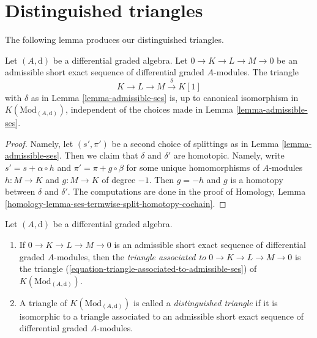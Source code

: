 \section{Distinguished triangles}
\label{section-distinguished}

\noindent
The following lemma produces our distinguished triangles.

\begin{lemma}
\label{lemma-triangle-independent-splittings}
Let $(A, \text{d})$ be a differential graded algebra. Let
$0 \to K \to L \to M \to 0$ be an admissible short exact sequence
of differential graded $A$-modules. The triangle
\begin{equation}
\label{equation-triangle-associated-to-admissible-ses}
K \to L \to M \xrightarrow{\delta} K[1]
\end{equation}
with $\delta$ as in Lemma \ref{lemma-admissible-ses} is, up to canonical
isomorphism in $K(\text{Mod}_{(A, \text{d})})$, independent of the choices
made in Lemma \ref{lemma-admissible-ses}.
\end{lemma}

\begin{proof}
Namely, let $(s', \pi')$ be a second choice of splittings as in
Lemma \ref{lemma-admissible-ses}. Then we claim that $\delta$ and $\delta'$
are homotopic. Namely, write $s' = s + \alpha \circ h$ and
$\pi' = \pi + g \circ \beta$ for some unique homomorphisms
of $A$-modules $h : M \to K$ and $g : M \to K$ of degree $-1$.
Then $g = -h$ and $g$ is a homotopy between $\delta$ and $\delta'$.
The computations are done in the proof of
Homology, Lemma \ref{homology-lemma-ses-termwise-split-homotopy-cochain}.
\end{proof}

\begin{definition}
\label{definition-distinguished-triangle}
Let $(A, \text{d})$ be a differential graded algebra.
\begin{enumerate}
\item If $0 \to K \to L \to M \to 0$ is an admissible short exact sequence
of differential graded $A$-modules, then the {\it triangle associated
to $0 \to K \to L \to M \to 0$} is the triangle 
(\ref{equation-triangle-associated-to-admissible-ses})
of $K(\text{Mod}_{(A, \text{d})})$.
\item A triangle of $K(\text{Mod}_{(A, \text{d})})$ is called a
{\it distinguished triangle} if it is isomorphic to a triangle
associated to an admissible short exact sequence
of differential graded $A$-modules.
\end{enumerate}
\end{definition}









